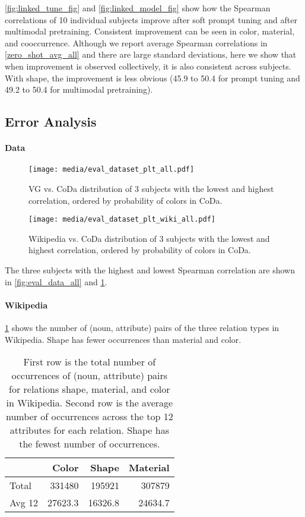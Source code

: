 \documentclass[11pt]{article}
\begin{document}
\cref{fig:linked_tune_fig} and \cref{fig:linked_model_fig} show how the Spearman correlations of 10 individual subjects improve after soft prompt tuning and after multimodal pretraining. Consistent improvement can be seen in color, material, and cooccurrence. 
Although we report average Spearman correlations in \cref{zero_shot_avg_all} and there are large standard deviations, here we show that when improvement is observed collectively, it is also consistent across subjects. With shape, the improvement is less obvious (45.9 to 50.4 for prompt tuning and 49.2 to 50.4 for multimodal pretraining).


\subsection{Error Analysis}

\paragraph{Data}
\label{sec:data-analysis}

\begin{figure}[ht]
    \centering
    \texttt{[image: media/eval\_dataset\_plt\_all.pdf]}
    \caption{VG vs. CoDa distribution of 3 subjects with the lowest and highest correlation, ordered by probability of colors in CoDa.}
    \label{fig:eval_data_all}

    \texttt{[image: media/eval\_dataset\_plt\_wiki\_all.pdf]}
    \caption{Wikipedia vs. CoDa distribution of 3 subjects with the lowest and highest correlation, ordered by probability of colors in CoDa.}
    \label{fig:eval_data_wiki_all}
\end{figure}

The three subjects with the highest and lowest Spearman correlation are shown in \cref{fig:eval_data_all} and \cref{fig:eval_data_wiki_all}.


\paragraph{Wikipedia}
\label{sec:wiki-data}
\cref{wiki-count} shows the number of (noun, attribute) pairs of the three relation types in Wikipedia. Shape has fewer occurrences than material and color.

\begin{table}[h]
\small
\centering
\begin{tabular}{lrrr}
\hline
 & \textbf{Color} & \textbf{Shape} & \textbf{Material} \\
\hline
Total & 331480 & 195921 & 307879 \\
Avg 12 & 27623.3 & 16326.8 & 24634.7 \\
\hline
\end{tabular}
\caption{\label{wiki-count}
First row is the total number of occurrences of (noun, attribute) pairs for relations shape, material, and color in Wikipedia. Second row is the average number of occurrences across the top 12 attributes for each relation. Shape has the fewest number of occurrences.}
\end{table}
\end{document}
